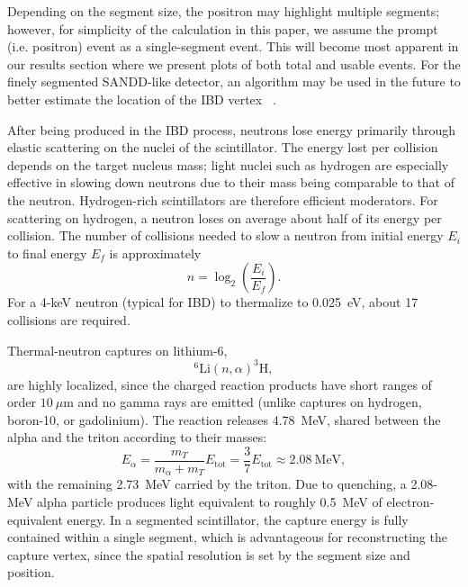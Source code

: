 \documentclass[tightenlines,twocolumn,prl,notitlepage,nofootinbib,preprintnumbers,longbibliography]{revtex4-1}
\begin{document}
Depending on the segment size, the positron may highlight multiple segments; however, for simplicity of the calculation in this paper, we assume the prompt (i.e. positron) event as a single-segment event. This will become most apparent in our results section where we present plots of both total and usable events. For the finely segmented SANDD-like detector, an algorithm may be used in the future to better estimate the location of the IBD vertex ~\cite{Sutanto:2021xpo}.

After being produced in the IBD process, neutrons lose energy primarily through elastic scattering on the nuclei of the scintillator. The energy lost per collision depends on the target nucleus mass; light nuclei such as hydrogen are especially effective in slowing down neutrons due to their mass being comparable to that of the neutron. Hydrogen-rich scintillators are therefore efficient moderators. For scattering on hydrogen, a neutron loses on average about half of its energy per collision. The number of collisions needed to slow a neutron from initial energy $E_i$ to final energy $E_f$ is approximately
\[
n = \log_2\left(\frac{E_i}{E_f}\right).
\]
For a 4-keV neutron (typical for IBD) to thermalize to 0.025~eV, about 17 collisions are required.

Thermal-neutron captures on lithium-6,
\[
^6\mathrm{Li}(n,\alpha)^3\mathrm{H},
\]
are highly localized, since the charged reaction products have short ranges of order $10~\mu\mathrm{m}$ and no gamma rays are emitted (unlike captures on hydrogen, boron-10, or gadolinium). The reaction releases 4.78~MeV, shared between the alpha and the triton according to their masses:
\[
E_\alpha = \frac{m_T}{m_\alpha + m_T} E_{\text{tot}} = \frac{3}{7} E_{\text{tot}} \approx 2.08~\text{MeV},
\]
with the remaining 2.73~MeV carried by the triton. Due to quenching, a 2.08-MeV alpha particle produces light equivalent to roughly 0.5~MeV of electron-equivalent energy. In a segmented scintillator, the capture energy is fully contained within a single segment, which is advantageous for reconstructing the capture vertex, since the spatial resolution is set by the segment size and position.
\end{document}
